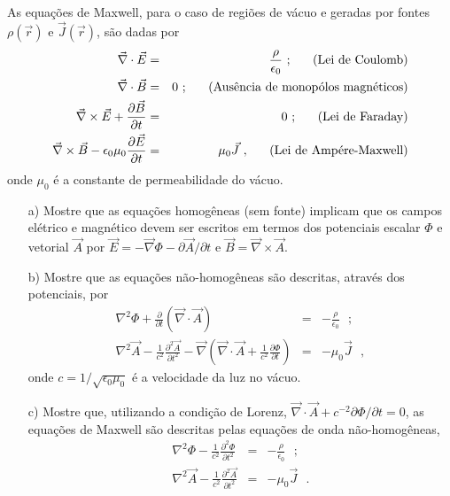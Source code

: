 \documentclass[a4paper,12pt]{article}
\begin{document}
\indent \par As equações de Maxwell, para o caso de regiões de vácuo e geradas por fontes $\rho(\vec{r})$ e $\vec{J}(\vec{r})$, são dadas por
%
\begin{eqnarray}
\nonumber
\vec{\nabla}\cdot \vec{E} &=& \frac{\rho}{\epsilon_{0}} ~; ~~~~~\textnormal{(Lei de Coulomb)}\\
\nonumber
\vec{\nabla}\cdot \vec{B} &=& 0 ~; ~~~~~\textnormal{(Ausência de monopólos magnéticos)}\\
\nonumber
\vec{\nabla}\times \vec{E} + \frac{\partial \vec{B}}{\partial t} &=& 0 ~; ~~~~~\textnormal{(Lei de Faraday)}\\
\nonumber
\vec{\nabla}\times \vec{B} - \epsilon_{0} \mu_{0} \frac{\partial \vec{E}}{\partial t} &=& \mu_{0}\vec{J} ~, ~~~~~\textnormal{(Lei de Ampére-Maxwell)}
\end{eqnarray}
%
\noindent onde $\mu_{0}$ é a constante de permeabilidade do vácuo.
%
\begin{itemize}
 \item[a)] Mostre que as equações homogêneas (sem fonte) implicam que os campos elétrico e magnético devem ser escritos em termos dos potenciais escalar $\Phi$ e vetorial $\vec{A}$ por $\vec{E}=-\vec{\nabla}\Phi- \partial \vec{A}/ \partial t$ e $\vec{B}=\vec{\nabla} \times \vec{A}$.
 \item[b)] Mostre que as equações não-homogêneas são descritas, através dos potenciais, por
 \begin{eqnarray}
\nonumber
\nabla^{2}\Phi + \frac{\partial}{\partial t} (\vec{\nabla} \cdot \vec{A}) &=& - \frac{\rho}{\epsilon_0} ~~~;\\
\nonumber
\nabla^{2}\vec{A} - \frac{1}{c^2} \frac{\partial^2 \vec{A}}{\partial t^2} - \vec{\nabla} \left( \vec{\nabla} \cdot \vec{A} + \frac{1}{c^2} \frac{\partial \Phi}{\partial t}  \right) &=& - \mu_0 \vec{J} ~~~,
\end{eqnarray}
%
\noindent onde $c=1/\sqrt{\epsilon_0 \mu_0}$ é a velocidade da luz no vácuo.
 \item[c)] Mostre que, utilizando a condição de Lorenz, $\vec{\nabla} \cdot \vec{A} + c^{-2} \partial \Phi /\partial t=0$, as equações de Maxwell são descritas pelas equações de onda não-homogêneas,
 \begin{eqnarray}
\nonumber
\nabla^{2}\Phi - \frac{1}{c^2} \frac{\partial^2 \Phi}{\partial t^2} &=& - \frac{\rho}{\epsilon_0} ~~~;\\
\nonumber
\nabla^{2}\vec{A} - \frac{1}{c^2} \frac{\partial^2 \vec{A}}{\partial t^2} &=& - \mu_0 \vec{J} ~~~.\\
\nonumber
\end{eqnarray}
\end{itemize}
\end{document}
